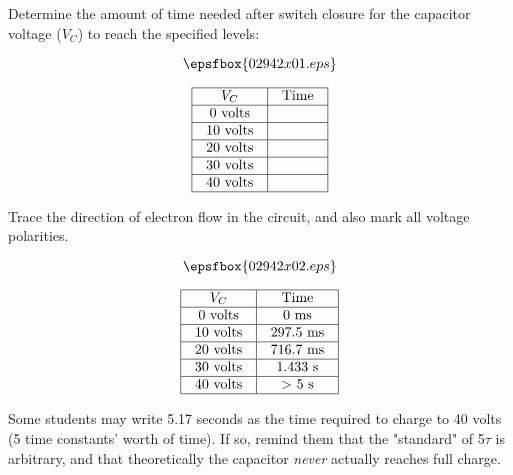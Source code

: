 

Determine the amount of time needed after switch closure for the capacitor voltage ($V_C$) to reach the specified levels:

$$\epsfbox{02942x01.eps}$$


$$\vbox{\offinterlineskip
\halign{\strut
\vrule \quad\hfil # \ \hfil & 
\vrule \quad\hfil # \ \hfil \vrule \cr
\noalign{\hrule}
%
$V_C$ & Time  \cr
%
\noalign{\hrule}
%
0 volts &  \cr
%
\noalign{\hrule}
%
10 volts &  \cr
%
\noalign{\hrule}
%
20 volts &  \cr
%
\noalign{\hrule}
%
30 volts &  \cr
%
\noalign{\hrule}
%
40 volts &  \cr
%
\noalign{\hrule}
} %
}$$ %

Trace the direction of electron flow in the circuit, and also mark all voltage polarities.







$$\epsfbox{02942x02.eps}$$


$$\vbox{\offinterlineskip
\halign{\strut
\vrule \quad\hfil # \ \hfil & 
\vrule \quad\hfil # \ \hfil \vrule \cr
\noalign{\hrule}
%
$V_C$ & Time  \cr
%
\noalign{\hrule}
%
0 volts & 0 ms \cr
%
\noalign{\hrule}
%
10 volts & 297.5 ms \cr
%
\noalign{\hrule}
%
20 volts & 716.7 ms \cr
%
\noalign{\hrule}
%
30 volts & 1.433 s \cr
%
\noalign{\hrule}
%
40 volts & $>$ 5 s \cr
%
\noalign{\hrule}
} %
}$$ %







Some students may write 5.17 seconds as the time required to charge to 40 volts (5 time constants' worth of time).  If so, remind them that the "standard" of 5$\tau$ is arbitrary, and that theoretically the capacitor {\it never} actually reaches full charge.




